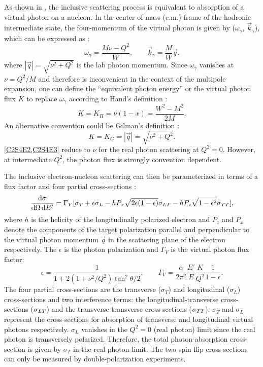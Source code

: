 As shown in , the inclusive scattering process is equivalent to absorption of a virtual photon on a nucleon. In the center of mass (c.m.) frame of the hadronic intermediate state, the four-momentum of the virtual photon is given by ($\omega_\gamma$, $\vec{k}_\gamma$), which can be expressed as \cite{Drechsel2004}:
\begin{equation} \label{C2S4E1}
\omega_\gamma = \frac{M\nu-Q^2}{W}, \qquad \vec{k}_\gamma = \frac{M}{W}\vec{q}.
\end{equation}
where $|\vec{q}|=\sqrt{\nu^2+Q^2}$ is the lab photon momentum. Since $\omega_\gamma$ vanishes at $\nu=Q^2/M$ and therefore is inconvenient in the context of the multipole expansion, one can define the ``equivalent photon energy'' or the virtual photon flux $K$ to replace $\omega_\gamma$ according to Hand's definition \cite{Hand1963}:
\begin{equation} \label{C2S4E2}
K = K_H = \nu(1-x) = \frac{W^2-M^2}{2M}.
\end{equation}
An alternative convention could be Gilman's definition \cite{Gilman1968}:
\begin{equation} \label{C2S4E3}
K = K_G = |\vec{q}| = \sqrt{\nu^2+Q^2}.
\end{equation}
\cref{C2S4E2,C2S4E3} reduce to $\nu$ for the real photon scattering at $Q^2=0$. However, at intermediate $Q^2$, the photon flux is strongly convention dependent.

The inclusive electron-nucleon scattering can then be parameterized in terms of a flux factor and four partial cross-sections \cite{Drechsel2001}:
\begin{equation} \label{C2S4E4}
\frac{\dd{\sigma}}{\dd{\Omega}\dd{E'}} = \Gamma_V[\sigma_T+\epsilon\sigma_L-hP_x\sqrt{2\epsilon(1-\epsilon)}\sigma_{LT}-hP_z\sqrt{1-\epsilon^2}\sigma_{TT}],
\end{equation}
where $h$ is the helicity of the longitudinally polarized electron and $P_z$ and $P_x$ denote the components of the target polarization parallel and perpendicular to the virtual photon momentum $\vec{q}$ in the scattering plane of the electron respectively. The $\epsilon$ is the photon polarization and $\Gamma_V$ is the virtual photon flux factor:
\begin{equation*}
\epsilon = \frac{1}{1+2(1+\nu^2/Q^2)\tan^2\theta/2}, \qquad \Gamma_V = \frac{\alpha}{2\pi^2}\frac{E'}{E}\frac{K}{Q^2}\frac{1}{1-\epsilon}.
\end{equation*}
The four partial cross-sections are the transverse ($\sigma_T$) and longitudinal ($\sigma_L$) cross-sections and two interference terms: the longitudinal-transverse cross-sections ($\sigma_{LT}$) and the transverse-transverse cross-sections ($\sigma_{TT}$). $\sigma_T$ and $\sigma_L$ represent the cross-sections for absorption of transverse and longitudinal virtual photons respectively. $\sigma_L$ vanishes in the $Q^2=0$ (real photon) limit since the real photon is transversely polarized. Therefore, the total photon-absorption cross-section is given by $\sigma_T$ in the real photon limit. The two spin-flip cross-sections can only be measured by double-polarization experiments.

